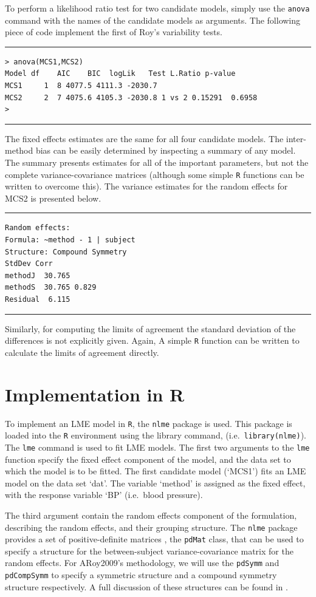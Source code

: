 \documentclass[12pt, a4paper]{report}
\theoremstyle{plain}
\theoremstyle{definition}
\theoremstyle{remark}
\begin{document}
To perform a likelihood ratio test for two candidate models, simply use the \texttt{anova} command with the names of the candidate models as arguments. The following piece of code implement the first of Roy's variability tests.
\\
\hrule
\begin{verbatim}
> anova(MCS1,MCS2)
Model df    AIC    BIC  logLik   Test L.Ratio p-value
MCS1     1  8 4077.5 4111.3 -2030.7
MCS2     2  7 4075.6 4105.3 -2030.8 1 vs 2 0.15291  0.6958
>
\end{verbatim}
\hrule
\vspace{1cm}
The fixed effects estimates are the same for all four candidate models. The inter-method bias can be easily determined by inspecting a summary of any model. The summary presents estimates for all of the important parameters, but not the complete variance-covariance matrices (although some simple \texttt{R} functions can be written to overcome this). The variance estimates for the random effects for MCS2 is presented below.
\\
\hrule
\begin{verbatim}
Random effects:
Formula: ~method - 1 | subject
Structure: Compound Symmetry
StdDev Corr
methodJ  30.765
methodS  30.765 0.829
Residual  6.115
\end{verbatim}
\hrule
\vspace{1cm}
Similarly, for computing the limits of agreement the standard deviation of the differences is not explicitly given. Again, A simple \texttt{R} function can be written to calculate the limits of agreement directly.

\newpage
	\section{Implementation in R}
	To implement an LME model in \texttt{R}, the \texttt{nlme} package is used. This package is loaded into the \texttt{R} environment using the library command, (i.e.\ \texttt{library(nlme)}). The \texttt{lme} command is used to fit LME models. The first two arguments to the \texttt{lme} function specify the fixed effect component of the model, and the data set to which the model is to be fitted. The first candidate model (`MCS1') fits an LME model on the data set `dat'. The variable `method' is assigned as the fixed effect, with the response variable `BP' (i.e.\ blood pressure).
	
	The third argument contain the random effects component of the formulation, describing the random effects, and their grouping structure. The \texttt{nlme} package provides a set of positive-definite matrices , the \texttt{pdMat} class, that can be used to specify a structure for the between-subject variance-covariance matrix for the random effects. For ARoy2009's methodology, we will use the \texttt{pdSymm} and \texttt{pdCompSymm} to specify a symmetric structure and a compound symmetry structure respectively. A full discussion of these structures can be found in \citet[pg. 158]{PB}.
	
\end{document}
